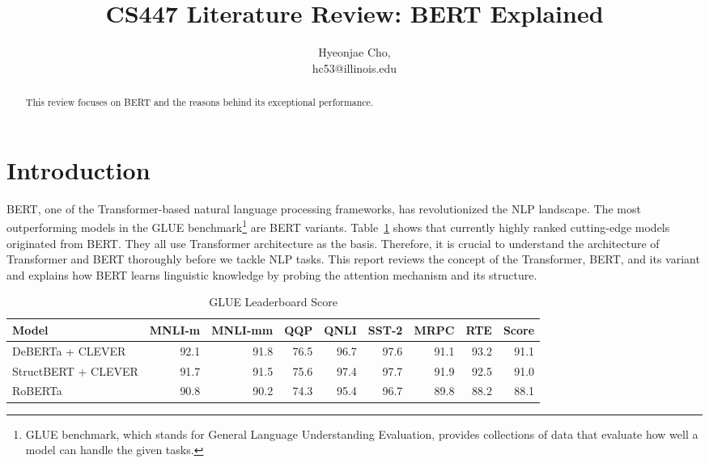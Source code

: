\documentclass[letterpaper, 11pt]{article}
\title{CS447 Literature Review: BERT Explained}
\author{Hyeonjae Cho,\\ hc53@illinois.edu}
\begin{document}
\maketitle

\begin{abstract}
This review focuses on BERT and the reasons behind its exceptional performance.
\end{abstract}

\section{Introduction}
\label{sec:introduction}
BERT, one of the Transformer-based natural language processing frameworks, has revolutionized the NLP landscape. The most outperforming models in the GLUE benchmark\footnote{GLUE benchmark, which stands for General Language Understanding Evaluation, provides collections of data that evaluate how well a model can handle the given tasks.} are BERT variants. Table~\ref{tab:my_label} shows that currently highly ranked cutting-edge models originated from BERT. They all use Transformer architecture as the basis. Therefore, it is crucial to understand the architecture of Transformer and BERT thoroughly before we tackle NLP tasks. This report reviews the concept of the Transformer, BERT, and its variant and explains how BERT learns linguistic knowledge by probing the attention mechanism and its structure.

\begin{table} %
    \centering
    \begin{tabular}{lrrrrrrrr}
    \toprule
       Model & MNLI-m & MNLI-mm & QQP & QNLI & SST-2 & MRPC & RTE & Score \\ %
         \midrule
DeBERTa + CLEVER & 92.1 & 91.8 & 76.5 & 96.7 & 97.6 & 91.1 & 93.2 & 91.1 \\
StructBERT + CLEVER  &  91.7 & 91.5 & 75.6 & 97.4 & 97.7 & 91.9 & 92.5 & 91.0 \\ 
RoBERTa  &  90.8 & 90.2 & 74.3 & 95.4 & 96.7 & 89.8 & 88.2 & 88.1 \\ 
         \bottomrule
    \end{tabular}
    \caption{GLUE Leaderboard Score}
    \label{tab:my_label}
\end{table}
\end{document}
